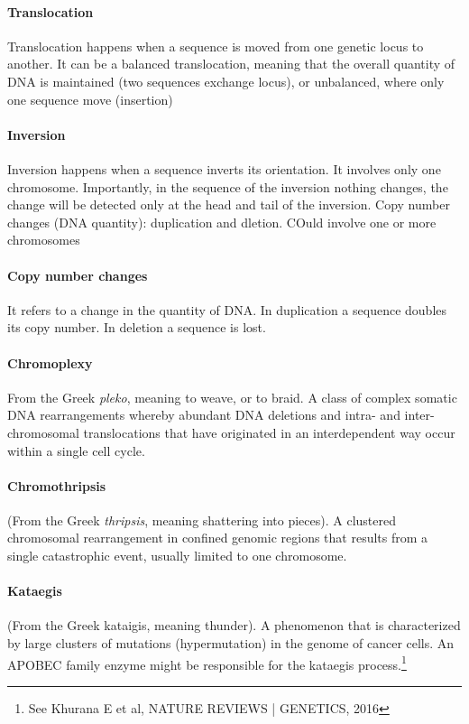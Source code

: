 			\paragraph*{Translocation}
			Translocation happens when a sequence is moved from one genetic locus to another.
			It can be a balanced translocation, meaning that the overall quantity of DNA is maintained (two sequences exchange locus), or unbalanced, where only one sequence move (insertion)

			\paragraph*{Inversion}
			Inversion happens when a sequence inverts its orientation. It involves only one 		chromosome.
			Importantly, in the sequence of the inversion nothing changes, the change will be detected only at the head and tail of the inversion.
Copy number changes (DNA quantity): duplication and dletion. COuld involve one or more chromosomes

			\paragraph*{Copy number changes}
			It refers to a change in the quantity of DNA.
			In duplication a sequence doubles its copy number.
			In deletion a sequence is lost.

			\paragraph*{Chromoplexy}
			From the Greek \textit{pleko}, meaning to weave, or to braid.
A class of complex somatic DNA rearrangements whereby abundant DNA deletions
and intra- and inter-chromosomal translocations that have originated in an
interdependent way occur within a single cell cycle.

			\paragraph*{Chromothripsis}
			(From the Greek \textit{thripsis}, meaning shattering into pieces).
A clustered chromosomal rearrangement in confined genomic regions that results
from a single catastrophic event, usually limited to one chromosome.
			\paragraph*{Kataegis}
			 (From the Greek kataigis, meaning thunder).
A phenomenon that is characterized by large clusters of mutations (hypermutation) in
the genome of cancer cells. An APOBEC family enzyme might be responsible for the
kataegis process.\footnote{See  Khurana E et al, NATURE REVIEWS | GENETICS, 2016 }


